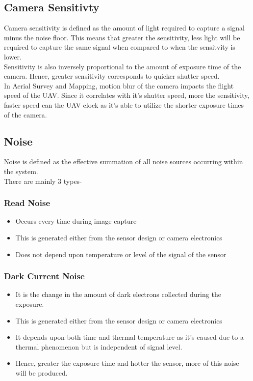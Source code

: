\documentclass[11pt,twocolumn,letterpaper]{article}
\begin{document}
\subsection{Camera Sensitivty}
Camera sensitivity is defined as the amount of light required to capture a signal minus the noise floor. 
This means that greater the sensitivity, less light will be required to capture the same signal when compared to when the sensitvity is lower.
\\ Sensitivity is also inversely proportional to the amount of exposure time of the camera. Hence, greater sensitivity corresponds to quicker shutter speed.
\\ In Aerial Survey and Mapping, motion blur of the camera impacts the flight speed of the UAV. Since it correlates with it's shutter speed, more the sensitivity, faster speed can the UAV clock as it's able to utilize the shorter exposure times of the camera.


\subsection{Noise}
Noise is defined as the effective summation of all noise sources occurring within the system. 
\\There are mainly 3 types-
\subsubsection{Read Noise}
\begin{itemize}
    \item Occurs every time during image capture
    \item  This is generated either from the sensor design or camera electronics
    \item Does not depend upon temperature or level of the signal of the sensor
\end{itemize}
\subsubsection{Dark Current Noise}
\begin{itemize}
    \item It is the change in the amount of dark electrons collected during the exposure.
    \item  This is generated either from the sensor design or camera electronics
    \item It depends upon both time and thermal temperature as it's caused due to a thermal phenomenon but is independent of signal level.
    \item Hence, greater the exposure time and hotter the sensor, more of this noise will be produced.
\end{itemize}
\end{document}
